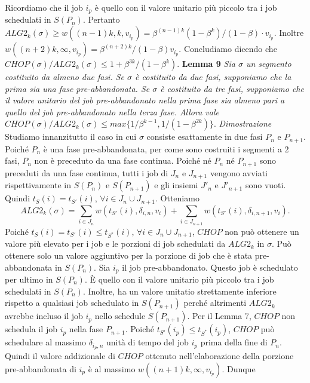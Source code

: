 \documentclass[12pt]{article}
\begin{document}
Ricordiamo che il job $i_{p}$ è quello con il valore unitario più piccolo tra i job schedulati in $S(P_{n})$. Pertanto $ALG2_{k}(\sigma) \geq w((n - 1) k, k, v_{i_{p}}) = \beta^{(n - 1)k} (1 - \beta^{k}) / (1 -\beta) \cdot v_{i_{p}}$. Inoltre $w((n + 2) k, \infty, v_{i_{p}}) = \beta^{(n + 2) k} / (1 - \beta) v_{i_{p}}$. Concludiamo dicendo che $CHOP(\sigma) / ALG2_{k}(\sigma) \leq 1 + \beta^{3k} / (1 - \beta^{k})$.
\newline \newline
\textbf{Lemma 9}
\textit{Sia $\sigma$ un segmento costituito da almeno due fasi. Se $\sigma$ è costituito da due fasi, supponiamo che la prima sia una fase pre-abbandonata. Se $\sigma$ è costituito da tre fasi, supponiamo che il valore unitario del job pre-abbandonato nella prima fase sia almeno pari a quello del job pre-abbandonato nella terza fase. Allora vale $CHOP(\sigma) / ALG2_{k}(\sigma) \leq max\{1 / \beta^{k - 1}, 1 / (1 - \beta^{2k})\}.$}
\newline \newline
\textit{Dimostrazione}
Studiamo innanzitutto il caso in cui $\sigma$ consiste esattamente in due fasi $P_{n}$ e $P_{n+1}$. Poiché $P_{n}$ è una fase pre-abbandonata, per come sono costruiti i segmenti a 2 fasi, $P_{n}$ non è preceduto da una fase continua. Poiché né $P_{n}$ né $P_{n+1}$ sono preceduti da una fase continua, tutti i job di $J_{n}$ e $J_{n+1}$ vengono avviati rispettivamente in $S(P_{n})$ e $S(P_{n+1})$ e gli insiemi $J'_{n}$ e $J'_{n+1}$ sono vuoti. Quindi $t_{S}(i) = t_{S'}(i)$, $\forall i \in J_{n} \cup J_{n+1}$. Otteniamo
\begin{equation}
ALG2_{k} (\sigma) = \sum_{i \in J_{n}} w (t_{S'}(i), \delta_{i,n}, v_{i}) + \sum_{i \in J_{n + 1}} w (t_{S'}(i), \delta_{i, n + 1}, v_{i}). \tag*{(1)}
\end{equation}
Poiché $t_{S}(i) = t_{S'}(i) \leq t_{S^{*}}(i)$, $\forall i \in J_{n} \cup J_{n+1}$, $CHOP$ non può ottenere un valore più elevato per i job e le porzioni di job schedulati da $ALG2_{k}$ in $\sigma$. Può ottenere solo un valore aggiuntivo per la porzione di job che è stata pre-abbandonata in $S(P_{n})$. Sia $i_{p}$ il job pre-abbandonato. Questo job è schedulato per ultimo in $S(P_{n})$. È quello con il valore unitario più piccolo tra i job schedulati in $S(P_{n})$. Inoltre, ha un valore unitatio strettamente inferiore rispetto a qualsiasi job schedulato in $S(P_{n+1})$ perché altrimenti $ALG2_{k}$ avrebbe incluso il job $i_{p}$ nello schedule $S(P_{n+1})$. Per il Lemma 7, $CHOP$ non schedula il job $i_{p}$ nella fase $P_{n+1}$. Poiché $t_{S'}(i_{p}) \leq t_{S^{*}}(i_{p})$, $CHOP$ può schedulare al massimo $\delta_{i_{p}, n}$ unità di tempo del job $i_{p}$ prima della fine di $P_{n}$. Quindi il valore addizionale di $CHOP$ ottenuto nell'elaborazione della porzione pre-abbandonata di $i_{p}$ è al massimo $w((n + 1) k, \infty, v_{i_{p}})$. Dunque
\end{document}
